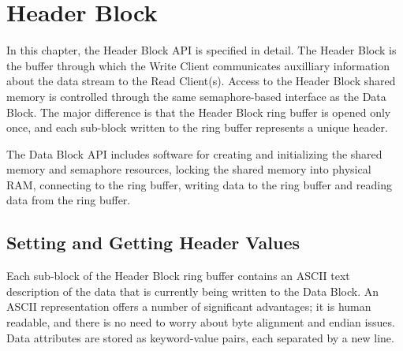 \chapter{Header Block}

In this chapter, the Header Block API is specified in detail.  The
Header Block is the buffer through which the Write Client communicates
auxilliary information about the data stream to the Read Client(s).
Access to the Header Block shared memory is controlled through the
same semaphore-based interface as the Data Block.  The major difference
is that the Header Block ring buffer is opened only once, and each
sub-block written to the ring buffer represents a unique header.

The Data Block API includes software for creating and initializing the
shared memory and semaphore resources, locking the shared memory into
physical RAM, connecting to the ring buffer, writing data to the ring
buffer and reading data from the ring buffer.

\section{Setting and Getting Header Values}

Each sub-block of the Header Block ring buffer contains an ASCII text
description of the data that is currently being written to the Data
Block.  An ASCII representation offers a number of significant
advantages; it is human readable, and there is no need to worry about
byte alignment and endian issues.  Data attributes are stored as
keyword-value pairs, each separated by a new line.

